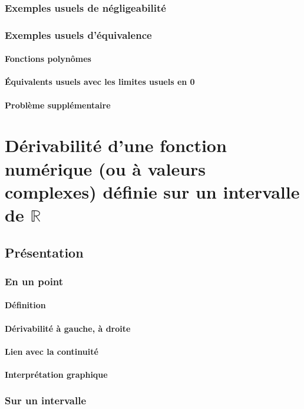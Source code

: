 \documentclass[12pt,a4paper,french]{book}
\begin{document}
		\subsection{Exemples usuels de négligeabilité}
		\subsection{Exemples usuels d'équivalence}
			\subsubsection{Fonctions polynômes}
			\subsubsection{Équivalents usuels avec les limites usuels en 0}
			\subsubsection{Problème supplémentaire}

\chapter{Dérivabilité d'une fonction numérique (ou à valeurs complexes) définie sur un intervalle de $\mathbb{R}$}
	\section{Présentation}
		\subsection{En un point}
			\subsubsection{Définition}
			\subsubsection{Dérivabilité à gauche, à droite}
			\subsubsection{Lien avec la continuité}
			\subsubsection{Interprétation graphique}
		\subsection{Sur un intervalle}
\end{document}
